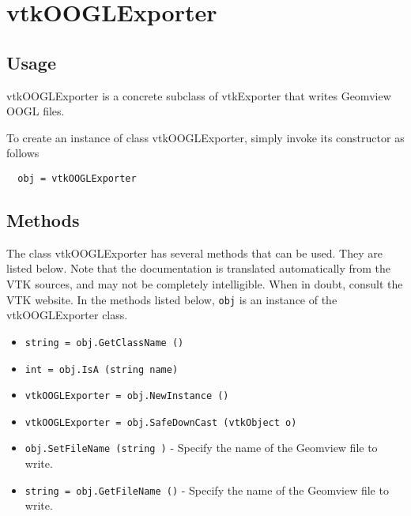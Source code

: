 \section{vtkOOGLExporter}

\subsection{Usage}

 vtkOOGLExporter is a concrete subclass of vtkExporter that writes
 Geomview OOGL files.


To create an instance of class vtkOOGLExporter, simply
invoke its constructor as follows
\begin{verbatim}
  obj = vtkOOGLExporter
\end{verbatim}
\subsection{Methods}

The class vtkOOGLExporter has several methods that can be used.
  They are listed below.
Note that the documentation is translated automatically from the VTK sources,
and may not be completely intelligible.  When in doubt, consult the VTK website.
In the methods listed below, \verb|obj| is an instance of the vtkOOGLExporter class.
\begin{itemize}
\item  \verb|string = obj.GetClassName ()|

\item  \verb|int = obj.IsA (string name)|

\item  \verb|vtkOOGLExporter = obj.NewInstance ()|

\item  \verb|vtkOOGLExporter = obj.SafeDownCast (vtkObject o)|

\item  \verb|obj.SetFileName (string )| -  Specify the name of the Geomview file to write.

\item  \verb|string = obj.GetFileName ()| -  Specify the name of the Geomview file to write.

\end{itemize}
